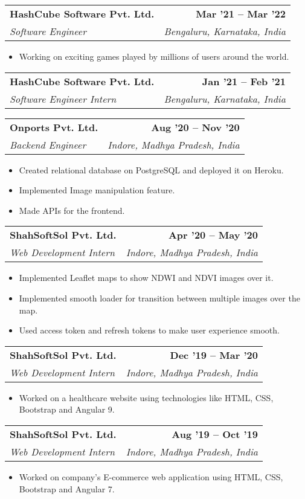 \documentclass[letterpaper,11pt]{article}
\makeatletter
\newcommand{\resumeItem}[1]{
  \item\small{
    {#1 \vspace{-2pt}}
  }
}
\newcommand{\resumeSubheading}[4]{
  \vspace{-2pt}\item
    \begin{tabular*}{1.0\textwidth}[t]{l@{\extracolsep{\fill}}r}
      \textbf{#1} & \textbf{\small #2} \\
      \textit{\small#3} & \textit{\small #4} \\
    \end{tabular*}\vspace{-7pt}
}
\newcommand{\resumeItemListStart}{\justify \begin{itemize}}
\newcommand{\resumeItemListEnd}{\end{itemize}\vspace{-5pt}}
\makeatother
\begin{document}
    \resumeSubheading
      {HashCube Software Pvt. Ltd.}{Mar ’21 -- Mar ’22}
      {Software Engineer}{Bengaluru, Karnataka, India}
      \vspace{-7pt}
      \resumeItemListStart
        \resumeItem{Working on exciting games played by millions of users around the world.}
      \resumeItemListEnd

    \resumeSubheading
      {HashCube Software Pvt. Ltd.}{Jan ’21 -- Feb ’21}
      {Software Engineer Intern}{Bengaluru, Karnataka, India}
      \vspace{-7pt}

    \resumeSubheading
      {Onports Pvt. Ltd.}{Aug ’20 -- Nov ’20}
      {Backend Engineer}{Indore, Madhya Pradesh, India}
      \vspace{-7pt}
      \resumeItemListStart
        \resumeItem{Created relational database on PostgreSQL and deployed it on Heroku.}
        \resumeItem{Implemented Image manipulation feature.}
        \resumeItem{Made APIs for the frontend.}
      \resumeItemListEnd

    \resumeSubheading
      {ShahSoftSol Pvt. Ltd.}{Apr ’20 -- May ’20}
      {Web Development Intern}{Indore, Madhya Pradesh, India}
      \vspace{-7pt}
      \resumeItemListStart
        \resumeItem{Implemented Leaflet maps to show NDWI and NDVI images over it.}
        \resumeItem{Implemented smooth loader for transition between multiple images over the map.}
        \resumeItem{Used access token and refresh tokens to make user experience smooth.}
      \resumeItemListEnd

    \resumeSubheading
      {ShahSoftSol Pvt. Ltd.}{Dec ’19 -- Mar ’20}
      {Web Development Intern}{Indore, Madhya Pradesh, India}
      \vspace{-7pt}
      \resumeItemListStart
        \resumeItem{Worked on a healthcare website using technologies like HTML, CSS, Bootstrap and Angular 9.}
      \resumeItemListEnd

    \resumeSubheading
      {ShahSoftSol Pvt. Ltd.}{Aug ’19 -- Oct ’19}
      {Web Development Intern}{Indore, Madhya Pradesh, India}
      \vspace{-7pt}
      \resumeItemListStart
        \resumeItem{Worked on company's E-commerce web application using HTML, CSS, Bootstrap and Angular 7.}
      \resumeItemListEnd
\end{document}
